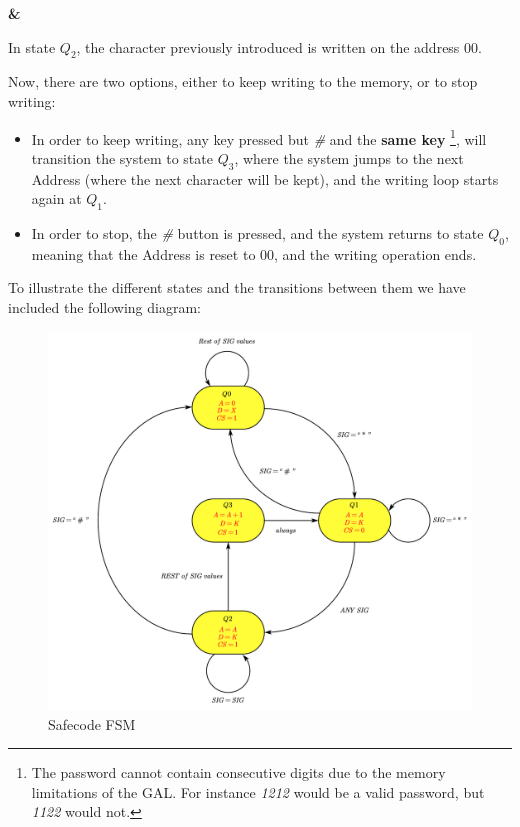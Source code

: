  \textbf{\&} \medskip

In state $Q_2$, the character previously introduced is written on the address $00$.\medskip

\clearpage

Now, there are two options, either to keep writing to the memory, or to stop writing:

\begin{itemize}
    \item In order to keep writing, any key pressed but \textit{\#} and the \textbf{same key} \footnote{The password cannot contain consecutive digits due to the memory limitations of the GAL. For instance \textit{1212} would be a valid password, but \textit{1122} would not.}, will transition the system to state $Q_3$, where the system jumps to the next Address (where the next character will be kept), and the writing loop starts again at \textit{$Q_1$}.
    
    \item In order to stop, the  \textit{\#} button is pressed, and the system returns to state \textit{$Q_0$}, meaning that  the Address is reset to $00$, and the writing operation ends.
\end{itemize}


To illustrate the different states and the transitions between them we have included the following diagram:\medskip

\begin{figure}[H]
    \centering
    \includegraphics[scale = 0.55]{Graphics/VHDL/Practice 6/SAFECODE/SAFECODE_FSM.pdf}
    \caption{Safecode FSM}
    \label{fig:SAFECODE_FSM}
\end{figure}

